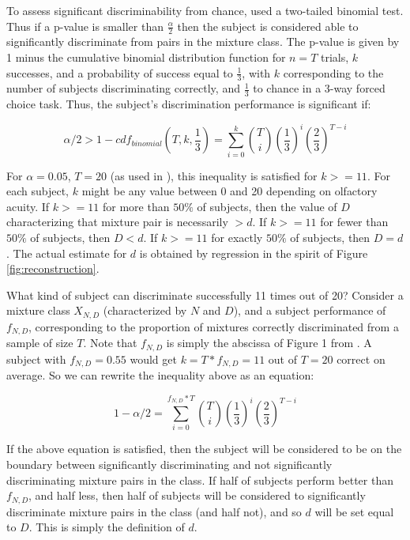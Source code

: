 \documentclass[letterpaper,twocolumn,10pt]{article}
\begin{document}
To assess significant discriminability from chance, 
\cite{bushdid_humans_2014} used a two-tailed binomial test. 
Thus if a p-value is smaller than $\frac{\alpha}{2}$ then the subject is considered able to significantly discriminate from pairs in the mixture class.  
The p-value is given by 1 minus the cumulative binomial distribution function for $n=T$ trials, $k$ successes, 
and a probability of success equal to $\frac{1}{3}$, 
with $k$ corresponding to the number of subjects discriminating correctly, and $\frac{1}{3}$ to chance in a 3-way forced choice task.  
Thus, the subject's discrimination performance is significant if: 

\begin{equation}
\label{eq:analytical1}
\alpha/2 > 1 - cdf_{binomial}(T,k,\frac{1}{3}) = \sum_{i=0}^{k} \binom{T}{i}(\frac{1}{3})^{i}(\frac{2}{3})^{T-i}
\end{equation}

For $\alpha=0.05$, $T=20$ (as used in \cite{bushdid_humans_2014}), this inequality is satisfied for $k>=11$.  
For each subject, $k$ might be any value between 0 and 20 depending on olfactory acuity.  
If $k>=11$ for more than $50\%$ of subjects, 
then the value of $D$ characterizing that mixture pair is necessarily $>d$.  
If $k>=11$ for fewer than $50\%$ of subjects, then $D<d$.  
If $k>=11$ for exactly $50\%$ of subjects, then $D=d$.  
The actual estimate for $d$ is obtained by regression in the spirit of Figure \ref{fig:reconstruction}.  

What kind of subject can discriminate successfully 11 times out of 20?  
Consider a mixture class $X_{N,D}$ (characterized by $N$ and $D$), 
and a subject performance of $f_{N,D}$, 
corresponding to the proportion of mixtures correctly discriminated from a sample of size $T$.  
Note that $f_{N,D}$ is simply the abscissa of Figure 1 from \cite{bushdid_humans_2014}.   
A subject with $f_{N,D}=0.55$ would get $k=T*f_{N,D}=11$ out of $T=20$ correct on average.  
So we can rewrite the inequality above as an equation:  

\begin{equation}
\label{eq:analytical2}
1 - \alpha/2 = \sum_{i=0}^{f_{N,D}*T} \binom{T}{i}(\frac{1}{3})^{i}(\frac{2}{3})^{T-i}
\end{equation}

If the above equation is satisfied, then the subject will be considered to be on the boundary 
between significantly discriminating and not significantly discriminating mixture pairs in the class.  
If half of subjects perform better than $f_{N,D}$, and half less, 
then half of subjects will be considered to significantly discriminate mixture pairs in the class (and half not), 
and so $d$ will be set equal to $D$.  
This is simply the definition of $d$.
\end{document}

